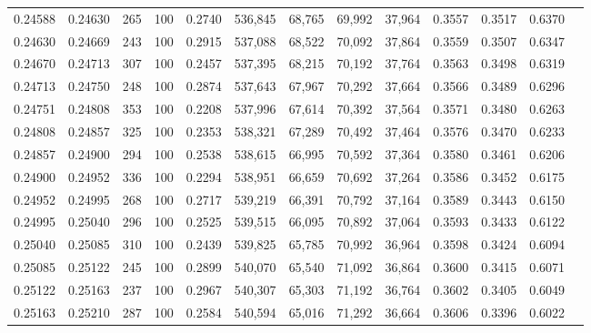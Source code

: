 \begin{tabular}{rrrrrrrrrrrrr}
0.24588 & 0.24630 &   265 & 100 &                                     0.2740 & 536,845 &  68,765 &  69,992 &  37,964 & 0.3557 & 0.3517 & 0.6370 \\
0.24630 & 0.24669 &   243 & 100 &                                     0.2915 & 537,088 &  68,522 &  70,092 &  37,864 & 0.3559 & 0.3507 & 0.6347 \\
0.24670 & 0.24713 &   307 & 100 &                                     0.2457 & 537,395 &  68,215 &  70,192 &  37,764 & 0.3563 & 0.3498 & 0.6319 \\
0.24713 & 0.24750 &   248 & 100 &                                     0.2874 & 537,643 &  67,967 &  70,292 &  37,664 & 0.3566 & 0.3489 & 0.6296 \\
0.24751 & 0.24808 &   353 & 100 &                                     0.2208 & 537,996 &  67,614 &  70,392 &  37,564 & 0.3571 & 0.3480 & 0.6263 \\
0.24808 & 0.24857 &   325 & 100 &                                     0.2353 & 538,321 &  67,289 &  70,492 &  37,464 & 0.3576 & 0.3470 & 0.6233 \\
0.24857 & 0.24900 &   294 & 100 &                                     0.2538 & 538,615 &  66,995 &  70,592 &  37,364 & 0.3580 & 0.3461 & 0.6206 \\
0.24900 & 0.24952 &   336 & 100 &                                     0.2294 & 538,951 &  66,659 &  70,692 &  37,264 & 0.3586 & 0.3452 & 0.6175 \\
0.24952 & 0.24995 &   268 & 100 &                                     0.2717 & 539,219 &  66,391 &  70,792 &  37,164 & 0.3589 & 0.3443 & 0.6150 \\
0.24995 & 0.25040 &   296 & 100 &                                     0.2525 & 539,515 &  66,095 &  70,892 &  37,064 & 0.3593 & 0.3433 & 0.6122 \\
0.25040 & 0.25085 &   310 & 100 &                                     0.2439 & 539,825 &  65,785 &  70,992 &  36,964 & 0.3598 & 0.3424 & 0.6094 \\
0.25085 & 0.25122 &   245 & 100 &                                     0.2899 & 540,070 &  65,540 &  71,092 &  36,864 & 0.3600 & 0.3415 & 0.6071 \\
0.25122 & 0.25163 &   237 & 100 &                                     0.2967 & 540,307 &  65,303 &  71,192 &  36,764 & 0.3602 & 0.3405 & 0.6049 \\
0.25163 & 0.25210 &   287 & 100 &                                     0.2584 & 540,594 &  65,016 &  71,292 &  36,664 & 0.3606 & 0.3396 & 0.6022 \\

\end{tabular}
